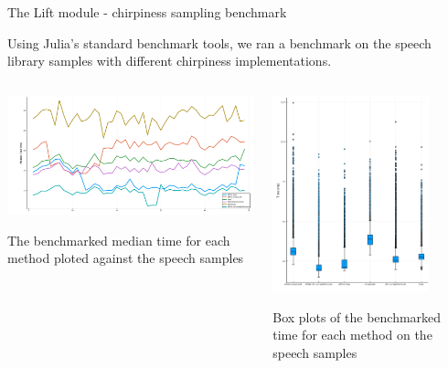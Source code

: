 \documentclass[10pt,american,ignorenonframetext,aspectratio=1610]{beamer}
\theoremstyle{remark}
\begin{document}
\begin{frame}{The Lift module - chirpiness sampling benchmark}
\protect\hypertarget{the-lift-module---chirpiness-sampling-benchmark}{}

Using Julia's standard benchmark tools, we ran a benchmark on the speech
library samples with different chirpiness implementations.

\begin{columns}[T]
\begin{column}{0.6\textwidth}
\includegraphics[width=1\textwidth,height=\textheight]{img/benchmark_median_time.png}

The benchmarked median time for each method ploted against the speech
samples
\end{column}

\begin{column}{0.4\textwidth}
\includegraphics[width=0.8\textwidth,height=\textheight]{img/benchmark_time_boxplot.png}

Box plots of the benchmarked time for each method on the speech samples
\end{column}
\end{columns}

\end{frame}
\end{document}
